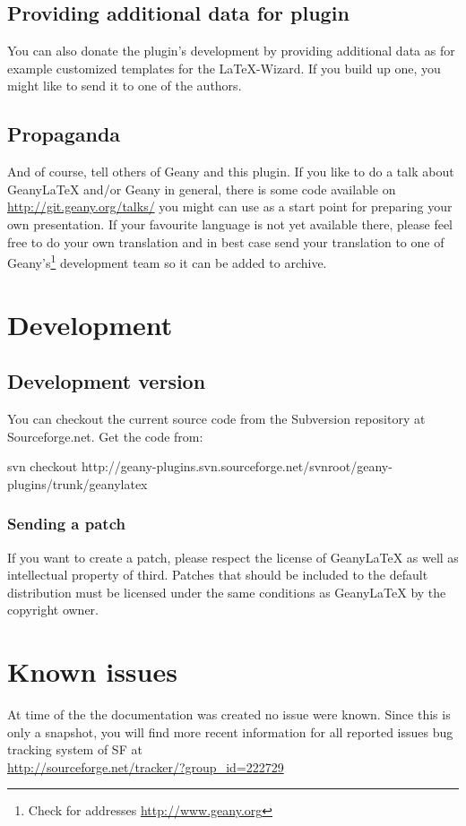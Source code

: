 \documentclass[%
a4paper,%
10pt,%
oneside,%
DIV18,
headsepline,
plainheadsepline,
footsepline,
plainfootsepline,
bibtotoc,%
liststotoc,%
BCOR12mm,%
halfparskip,%
openany,%
]{scrartcl}
\begin{document}
\subsection{Providing additional data for plugin} 
You can also donate the plugin's development by providing additional 
data as for example customized templates for the \LaTeX-Wizard. If 
you build up one, you might like to send it to one of the authors.

\subsection{Propaganda}
And of course, tell others of Geany and this plugin. If you like to do
a talk about Geany\LaTeX{} and/or Geany in general, there is some code
available on \url{http://git.geany.org/talks/} you might can use as a
start point for preparing your own presentation. If your favourite
language is not yet available there, please feel free to do your own
translation and in best case send your translation to one of
Geany's\footnote{Check for addresses \url{http://www.geany.org}}
development team so it can be added to archive.


\section{Development}
\subsection{Development version}
You can checkout the current source code from the Subversion repository
at Sourceforge.net. Get the code from:

svn checkout
http://geany-plugins.svn.sourceforge.net/svnroot/geany-plugins/trunk/geanylatex

\subsubsection{Sending a patch}
If you want to create a patch, please respect the license of
Geany\LaTeX{} as well as intellectual property of third. Patches that
should be included to the default distribution must be licensed under
the same conditions as Geany\LaTeX{} by the copyright owner.

\section{Known issues}
At time of the the documentation was created no issue were known.
Since this is only a snapshot, you will find more recent information
for all reported issues bug tracking system of SF at \\
\url{http://sourceforge.net/tracker/?group\_id=222729}
\end{document}
